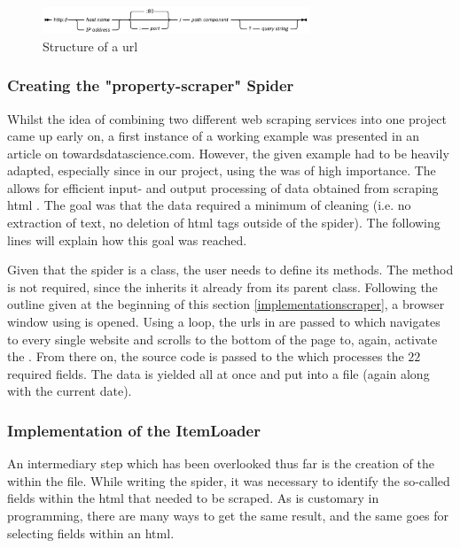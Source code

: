 \documentclass[main]{subfiles}
\begin{document}
\begin{figure}[htbp]
    \centerline{
        \includegraphics[width = 80mm]{prog_4.png}}
    \caption{Structure of a \acs*{url} \cite{IBMDocumentation2021}}
    \label{fig:htmlstructure}
\end{figure}

\vspace*{5pt}
\subsubsection{Creating the "property-scraper" Spider}
Whilst the idea of combining two different web scraping services into one project came up early on,
a first instance of a working example was presented in an article on towardsdatascience.com\cite{reusovaWebScrapingLess2019}.
However, the given example had to be heavily adapted, especially since in our project, 
using the \pkg[ItemLoader] was of high importance.
The \pkg[ItemLoader] allows for efficient input- and output processing of data obtained from scraping \acs*{html} \cite{ScrapyTutorialScrapy}. 
The goal was that the data required a minimum of cleaning (i.e. no extraction of text, no deletion of \acs*{html} tags outside of the spider).
The following lines will explain how this goal was reached.

Given that the spider is a class, the user needs to define its methods. 
The  method is not required, since the  inherits it already 
from its parent class.
Following the outline given at the beginning of this section \ref{implementationscraper},
a browser window using  \pkg[Selenium] is opened.
Using a \pkg[for] loop, the \acsp*{url} in  are passed to \pkg[Selenium,]
which navigates to every single website and scrolls to the bottom of the page to, again, activate the \jss.
From there on, the source code is passed to the \pkg[ItemLoader] which processes the $22$ required fields.
The data is yielded all at once and put into a \pkg[.csv] file (again along with the current date).

\vspace*{5pt}
\subsubsection{Implementation of the ItemLoader}
\label{itemloader}
An intermediary step which has been overlooked thus far is the creation of the \pkg[ItemLoader] within the \pkg[items.py] file.
While writing the  spider, it was necessary to identify the so-called fields within the \acs*{html}
that needed to be scraped.
As is customary in programming, there are many ways to get the same result, 
and the same goes for selecting fields within an \acs*{html}.
\end{document}
